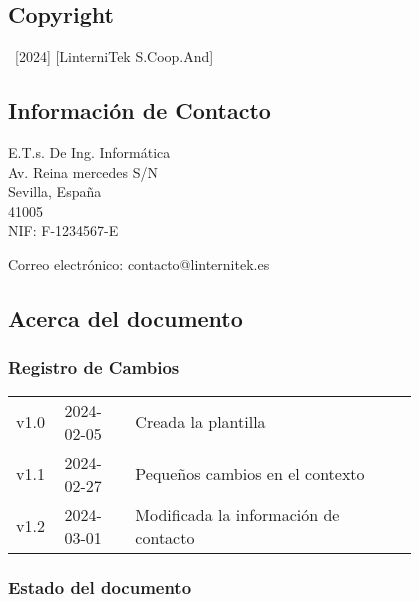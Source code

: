 \documentclass[
	a4paper, %
	12pt, %
]{CSSullivanBusinessReport}
\begin{document}
\begin{twothirdswidth} %
	\footnotesize %
	
	
	\subsection*{Copyright}
	
	\textcopyright~[2024] [LinterniTek S.Coop.And] 
	
	\subsection*{Información de Contacto}
	E.T.s. De Ing. Informática\\
	Av. Reina mercedes S/N\\
    Sevilla, España\\
	41005\\
	
	NIF: F-1234567-E
	
	Correo electrónico: contacto@linternitek.es
	
	\vfill %
	\subsection*{Acerca del documento}
	\subsubsection*{Registro de Cambios}
	
	\scriptsize %
	
	\begin{tabular}{@{} L{0.05\linewidth} L{0.15\linewidth} L{0.6\linewidth} @{}} %
		\toprule %
		v1.0 & 2024-02-05 & Creada la plantilla \\
		v1.1 & 2024-02-27 &  Pequeños cambios en el contexto\\ 
		v1.2 & 2024-03-01 & Modificada la información de contacto\\
		\bottomrule
	\end{tabular}
    \subsubsection*{Estado del documento}
    \scriptsize
      

\end{twothirdswidth}
\end{document}
